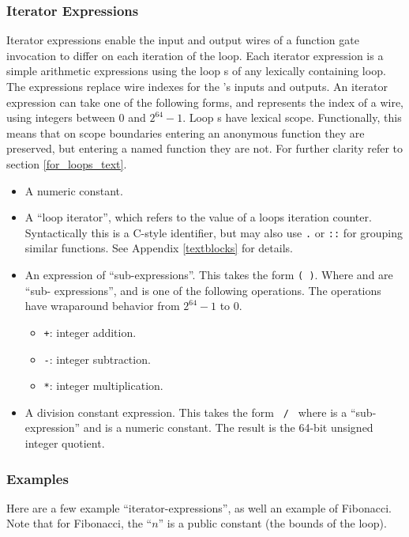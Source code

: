 \subsubsection*{Iterator Expressions}\label{overview-iterators}
Iterator expressions enable the input and output wires of a function gate invocation to differ on each iteration of the loop.
Each iterator expression is a simple arithmetic expressions using the loop s of any lexically containing loop.
The expressions replace wire indexes for the 's inputs and outputs.
An iterator expression can take one of the following forms, and represents the index of a wire, using integers between $0$ and $2^{64}-1$.
Loop s have lexical scope.
Functionally, this means that on scope boundaries entering an anonymous function they are preserved, but entering a named function they are not.
For further clarity refer to section \ref{for_loops_text}. \\

\begin{itemize}
    \item A numeric constant.
    \item A ``loop iterator'', which refers to the value of a loops iteration counter.
    Syntactically this is a C-style identifier, but may also use \texttt{.} or \texttt{::} for grouping similar functions. See Appendix \ref{textblocks} for details.
    \item An expression of ``sub-expressions''. This takes the form \texttt{(  )}. Where  and  are ``sub- expressions'', and  is one of the following operations.
    The operations have wraparound behavior from $2^{64}-1$ to $0$.
    \begin{itemize}
        \item \texttt{+}: integer addition.
        \item \texttt{-}: integer subtraction.
        \item \texttt{*}: integer multiplication.
    \end{itemize}
    \item A division constant expression. This takes the form \texttt{ / } where  is a ``sub-expression'' and  is a numeric constant. The result is the 64-bit unsigned integer quotient.
\end{itemize}

\subsubsection*{Examples}
Here are a few example ``iterator-expressions'', as well an example of Fibonacci.
Note that for Fibonacci, the ``$n$'' is a public constant (the bounds of the loop).

